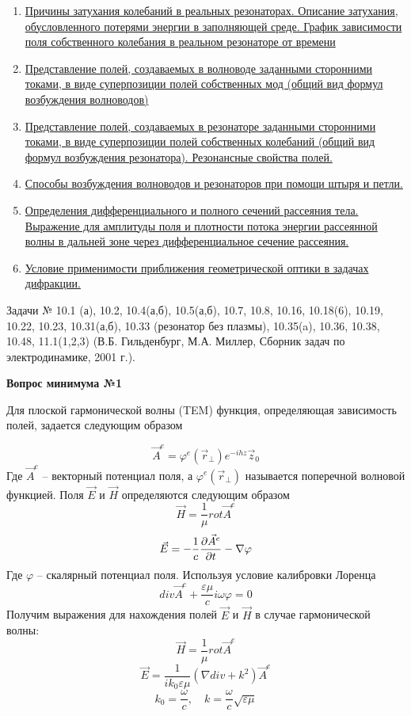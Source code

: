 \documentclass[a4paper,14pt]{extarticle}
\renewcommand{\phi}{\varphi}
\renewcommand{\epsilon}{\varepsilon}
\newcommand{\ticket}[1] {
\newpage
\hypertarget{num#1}{}
\begin{center}
	\textbf{Вопрос минимума №#1 }
\end{center}
}
\begin{document}
\begin{enumerate}
		\item 
		\hyperlink{num12}{Причины затухания колебаний в реальных резонаторах. Описание затухания, обусловленного потерями энергии в заполняющей среде. График зависимости поля собственного колебания в реальном резонаторе от времени}
		\item 
		\hyperlink{num13}{Представление полей, создаваемых в волноводе заданными сторонними токами, в виде суперпозиции полей собственных мод (общий вид формул возбуждения волноводов)}
		\item 
		\hyperlink{num14}{Представление полей, создаваемых в резонаторе заданными сторонними токами, в виде суперпозиции полей собственных колебаний (общий вид формул возбуждения резонатора). Резонансные свойства полей.}
		\item 
		\hyperlink{num15}{Способы возбуждения волноводов и резонаторов при помощи штыря и петли.}
		\item 
		\hyperlink{num16}{Определения дифференциального и полного сечений рассеяния тела. Выражение для амплитуды поля и плотности потока энергии рассеянной волны в дальней зоне через дифференциальное сечение рассеяния.}
		\item 
		\hyperlink{num17}{Условие применимости приближения геометрической оптики в задачах дифракции.}
		
	\end{enumerate}
	
	Задачи № 10.1 (а), 10.2, 10.4(а,б), 10.5(а,б), 10.7, 10.8, 10.16, 10.18(6), 10.19, 10.22, 10.23, 10.31(а,б), 10.33 (резонатор без плазмы), 10.35(a), 10.36, 10.38, 10.48, 11.1(1,2,3)
	(В.Б. Гильденбург, М.А. Миллер, Сборник задач по электродинамике, 2001 г.).
	\ticket{1}
	Для плоской гармонической волны (TEM) функция, определяющая зависимость полей, задается следующим образом 
	
	$$\vec{A}^e = \phi^e(\vec{r}_\perp)e^{-ihz}\vec{z}_0$$
	Где $\vec{A}^e$ -- векторный потенциал поля, а $\phi^e(\vec{r}_\perp)$ называется поперечной волновой функцией. Поля $\vec{E}$ и $\vec{H}$ определяются следующим образом
	$$\vec{H}=\frac{1}{\mu} rot\vec{A}^e $$
	$$\vec{E}=-\frac{1}{c} \pdv{\vec{A}^e}{t}-\nabla{\phi} $$
	Где $\phi$ -- скалярный потенциал поля. 
	Используя условие калибровки Лоренца
	$$div\vec{A}^e+\frac{\epsilon\mu}{c}i\omega\phi=0$$
	Получим выражения для нахождения полей $\vec{E}$ и $\vec{H}$ в случае гармонической волны:
	$$\vec{H}=\frac{1}{\mu} rot\vec{A}^e $$
	$$\vec{E}=\frac{1}{i k_0\epsilon\mu}(\nabla div + k^2)\vec{A}^e $$
	$$k_0=\frac{\omega}{c}, \quad k=\frac{\omega}{c}\sqrt{\epsilon\mu}$$
	
\end{document}
